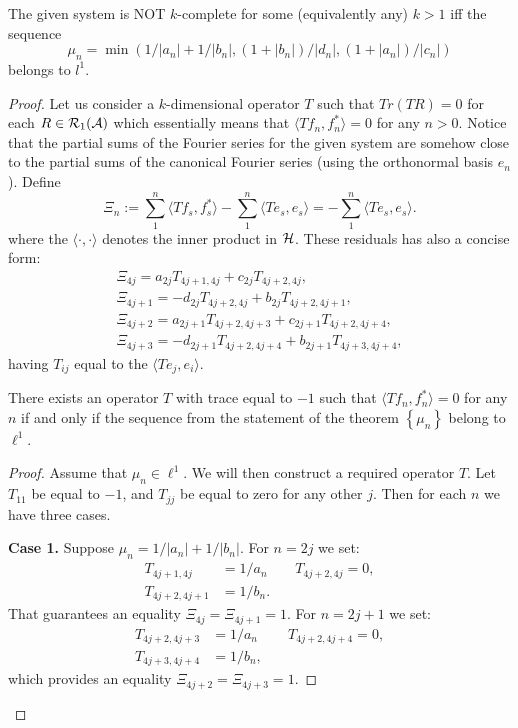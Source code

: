 \documentclass[12pt]{amsart}
\theoremstyle{case}
\begin{document}
  \begin{theorem}
      The given system is NOT $k$-complete for some (equivalently any) $k > 1$ iff the sequence
      $$
          \mu_n = \min(1/|a_n| + 1/|b_n|, (1 + |b_n|)/|d_n|, (1 + |a_n|)/|c_n|)
      $$ belongs to $l^1$.
  \end{theorem}
  \begin{proof}
      Let us consider a $k$-dimensional operator $T$ such that 
      $Tr(TR) = 0$ for each $R \in \cal{R}_1(\cal{A})$ which essentially means that
      $\langle Tf_n, f_n^* \rangle = 0$ for any $n > 0$. 
      Notice that the partial sums of the Fourier series for the given system are somehow close to the
      partial sums of the canonical Fourier series (using the orthonormal basis $e_n$). Define
      $$
        \Xi_n := \sum_1^n \langle Tf_s, f_s^* \rangle - \sum_1^n \langle Te_s, e_s \rangle = -\sum_1^n \langle Te_s, e_s \rangle.
      $$
      where the $\langle \cdot, \cdot\rangle$ denotes the inner product in $\cal{H}$.
      These residuals has also a concise form:
      \begin{align*}
          \Xi_{4j} = a_{2j} T_{4j+1, 4j} + c_{2j} T_{4j+2, 4j},\\
          \Xi_{4j + 1} = -d_{2j} T_{4j+2, 4j} + b_{2j} T_{4j+2, 4j+1},\\
          \Xi_{4j + 2} = a_{2j+1} T_{4j+2, 4j+3} + c_{2j+1} T_{4j+2, 4j+4},\\
          \Xi_{4j + 3} = -d_{2j+1} T_{4j+2, 4j+4} + b_{2j+1} T_{4j+3, 4j+4},
      \end{align*}
      having $T_{ij}$ equal to the $\langle Te_j, e_i\rangle$.
      \begin{prop}
          \label{inf-dim-statement}
          There exists an operator $T$ with trace equal to $-1$ such that
            $\langle Tf_n, f_n^*\rangle = 0$ for any $n$ if and only if the
            sequence from the statement of the theorem $\left\{\mu_n\right\}$ belong to $\ell^1$.
      \end{prop}
      \begin{proof}
          Assume that $\mu_n \in \ell^1$.
          We will then construct a required operator $T$.
          Let $T_{11}$ be equal to $-1$, and $T_{jj}$ be equal to zero for any other $j$.
          Then for each $n$ we have three cases.

          \noindent\textbf{Case 1.} Suppose $\mu_n = 1/|a_n| + 1/|b_n|$. For $n=2j$ we set:
          \begin{align*}
            T_{4j+1,4j}&=1/a_n & \quad T_{4j+2,4j} = 0,\\
            T_{4j+2,4j+1}&=1/b_n.
          \end{align*}
          That guarantees an equality $\Xi_{4j} = \Xi_{4j+1} = 1$.
          For $n=2j+1$ we set:
          \begin{align*}
            T_{4j+2,4j+3}&=1/a_n & \quad T_{4j+2,4j+4} = 0,\\
            T_{4j+3,4j+4}&=1/b_n,
          \end{align*}
          which provides an equality $\Xi_{4j+2} = \Xi_{4j+3} = 1$.


\end{proof}
\end{proof}
\end{document}

